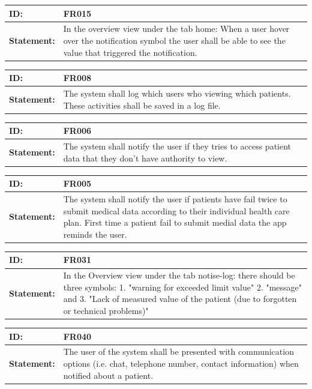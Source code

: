 \documentclass{scrreprt}
\begin{document}
\begin{center}
\begin{tabularx}{\linewidth}{| l | X |}
 \hline
 \textbf{ID:} & FR015  \\ 
 \hline
 \textbf{Statement:} & In the overview view under the tab home: 
When a user hover over the notification symbol the user shall be able to see the value that triggered the notification.
\\ 
 \hline
\end{tabularx}

\begin{tabularx}{\linewidth}{| l | X |}
 \hline
 \textbf{ID:} & FR008  \\ 
 \hline
 \textbf{Statement:} & The system shall log which users who viewing which patients. These activities shall be saved in a log file.
\\ 
 \hline
\end{tabularx}

\begin{tabularx}{\linewidth}{| l | X |}
 \hline
 \textbf{ID:} & FR006  \\ 
 \hline
 \textbf{Statement:} & The system shall notify the user if they tries to access patient data that they don't have authority to view.\\ 
 \hline
\end{tabularx}

\begin{tabularx}{\linewidth}{| l | X |}
 \hline
 \textbf{ID:} & FR005  \\ 
 \hline
 \textbf{Statement:} & The system shall notify the user if patients have fail twice to submit medical data according to their individual health care plan. First time a patient fail to submit medial data the app reminds the user. \\ 
 \hline
\end{tabularx}

\begin{tabularx}{\linewidth}{| l | X |}
 \hline
 \textbf{ID:} & FR031  \\ 
 \hline
 \textbf{Statement:} & In the Overview view under the tab notise-log: there should be three symbols: 1. "warning for exceeded limit value" 2. "message" and 3. "Lack of measured value of the patient (due to forgotten or technical problems)" \\ 
 \hline
\end{tabularx}

\begin{tabularx}{\linewidth}{| l | X |}
 \hline
 \textbf{ID:} & FR040  \\ 
 \hline
 \textbf{Statement:} & The user of the system shall be presented with communication options (i.e. chat, telephone number, contact information) when notified about a patient. \\ 
 \hline
\end{tabularx}


\end{center}
\end{document}
